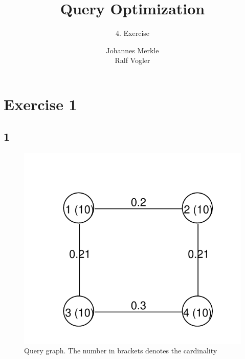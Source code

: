 \documentclass[11pt,a4paper]{scrartcl}
\begin{document}
\author{Johannes Merkle\\Ralf Vogler}
\title{Query Optimization}
\subtitle{4. Exercise}

\maketitle

\section*{Exercise 1}

\subsection*{1}

\begin{figure}[H]
	\begin{center}
		\includegraphics{graphs/querygraph}
	\end{center}
	\caption{Query graph. The number in brackets denotes the cardinality}
	\label{fig:qg}
\end{figure}
	
\end{document}
